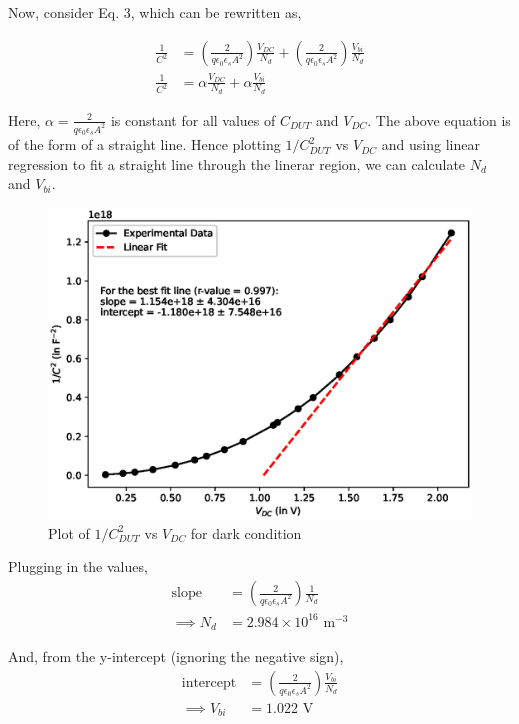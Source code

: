 Now, consider Eq. 3, which can be rewritten as,

\begin{align}
    \frac{1}{C^2} &= \left(\frac{2}{q\epsilon_0\epsilon_sA^2}\right)\frac{V_{DC}}{N_d} + \left(\frac{2}{q\epsilon_0\epsilon_sA^2}\right)\frac{V_{bi}}{N_d} \nonumber\\
    \frac{1}{C^2} &= \alpha\frac{V_{DC}}{N_d} + \alpha\frac{V_{bi}}{N_d}
\end{align}

Here, $\alpha = \frac{2}{q\epsilon_0\epsilon_sA^2}$ is constant for all values of $C_{DUT}$ and $V_{DC}$. The above equation is of the form of a straight line. Hence plotting $1/C^2_{DUT}$ vs $V_{DC}$ and using linear regression to fit a straight line through the linerar region, we can calculate $N_d$ and $V_{bi}$. 

\begin{figure}
    \centering
    \includegraphics[width=1\columnwidth]{images/dark.eps}
    \caption{Plot of $1/C_{DUT}^2$ vs $V_{DC}$ for dark condition}
\end{figure}

Plugging in the values,
\begin{align*}
    \text{slope} &= \left(\frac{2}{q\epsilon_0\epsilon_sA^2}\right)\frac{1}{N_d}\\
    \implies N_d &= 2.984 \times 10^{16} \text{ m}^{-3}
\end{align*}

And, from the y-intercept (ignoring the negative sign),
\begin{align*}
    \text{intercept} &= \left(\frac{2}{q\epsilon_0\epsilon_sA^2}\right)\frac{V_{bi}}{N_d}\\
    \implies V_{bi} &= 1.022 \text{ V}
\end{align*}

